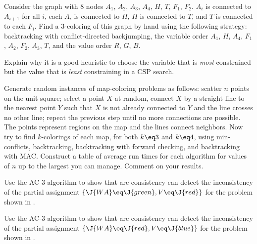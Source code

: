
\begin{exercise}%
Consider the graph with 8 nodes \(A_1\), \(A_2\), \(A_3\), \(A_4\), \(H\), \(T\),
\(F_1\), \(F_2\).  \(A_i\) is connected to \(A_{i+1}\) for all \(i\), each \(A_i\)
is connected to \(H\), \(H\) is connected to \(T\), and \(T\) is connected to
each \(F_i\).  Find a 3-coloring of this graph by hand using the following strategy:
backtracking with conflict-directed backjumping, the variable order \(A_1\),
\(H\), \(A_4\), \(F_1\), \(A_2\), \(F_2\), \(A_3\), \(T\), and the value order \(R\),
\(G\), \(B\).
\end{exercise} 

\begin{exercise}
Explain why it is a good heuristic to choose the variable that is {\em
most} constrained but the value that is {\em least} constraining in a CSP search.
\end{exercise} 

\begin{exercise}
\prgex Generate random instances of map-coloring problems as follows:
scatter \(n\) points on the unit square; select a point \(X\) at
random, connect \(X\) by a straight line to the nearest point \(Y\)
such that \(X\) is not already connected to \(Y\) and the line crosses
no other line; repeat the previous step until no more connections are
possible.  The points represent regions on the map and the lines
connect neighbors. Now try to find \(k\)-colorings of each map, for
both \(k\eq 3\) and \(k \eq 4\), using min-conflicts, backtracking,
backtracking with forward checking, and backtracking with MAC.
Construct a table of average run times for each algorithm for values of
\(n\) up to the largest you can manage.  Comment on your results.
\end{exercise} 

\begin{uexercise}
Use the AC-3 algorithm to show that arc consistency can detect the inconsistency of the
partial assignment \(\{\J{WA}\eq \J{green},V\eq \J{red}\}\) for the problem shown in
. 
\end{uexercise} 

\begin{iexercise}
Use the AC-3 algorithm to show that arc consistency can detect the inconsistency of the
partial assignment \(\{\J{WA}\eq \J{red},V\eq \J{blue}\}\) for the problem shown in
. 
\end{iexercise} 

